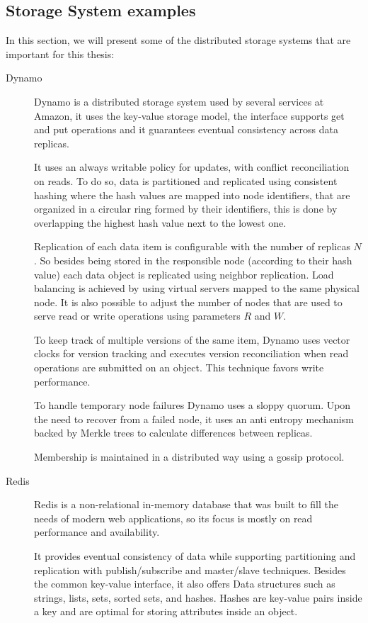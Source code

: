 \subsection{Storage System examples}
\label{sec:storage_system_examples}
In this section, we will present some of the distributed storage systems that are important for this thesis:

\begin{description}
\item[Dynamo~\cite{dynamo}] Dynamo is a distributed storage system used by several services at Amazon, it uses the key-value storage model, the interface supports get and put operations and it guarantees eventual consistency across data replicas.\par
	It uses an always writable policy for updates, with conflict reconciliation on reads. To do so, data is partitioned and replicated using consistent hashing where the hash values are mapped into node identifiers, that are organized in a circular ring formed by their identifiers, this is done by overlapping the highest hash value next to the lowest one.\par
	Replication of each data item is configurable with the number of replicas $N$. So besides being stored in the responsible node (according to their hash value) each data object is replicated using neighbor replication. Load balancing is achieved by using virtual servers mapped to the same physical node. It is also possible to adjust the number of nodes that are used to serve read or write operations using parameters $R$ and $W$.\par
	To keep track of multiple versions of the same item, Dynamo uses vector clocks for version tracking and executes version reconciliation when read operations are submitted on an object. This technique favors write performance.\par
	To handle temporary node failures Dynamo uses a sloppy quorum. Upon the need to recover from a failed node, it uses an anti entropy mechanism backed by Merkle trees to calculate differences between replicas.\par
	Membership is maintained in a distributed way using a gossip protocol.
	
\item[Redis]\cite{redis} Redis is a non-relational in-memory database that was built to fill the needs of modern web applications, so its focus is mostly on read performance and availability.\par
	It provides eventual consistency of data while supporting partitioning and replication with publish/subscribe and master/slave techniques. Besides the common key-value interface, it also offers Data structures such as strings, lists, sets, sorted sets, and hashes. Hashes are key-value pairs inside a key and are optimal for storing attributes inside an object.


\end{description}
